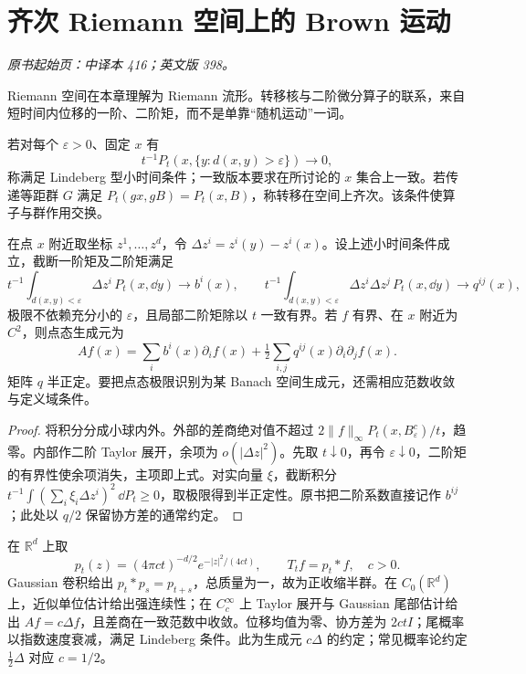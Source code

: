 \section{齐次 Riemann 空间上的 Brown 运动}\label{sec:yosida-13-05}
\noindent\textit{原书起始页：中译本 416；英文版 398。}

Riemann 空间在本章理解为 Riemann 流形。转移核与二阶微分算子的联系，来自短时间内位移的一阶、二阶矩，而不是单靠“随机运动”一词。

\begin{definition}[局部性条件与空间齐次]
若对每个 $\varepsilon>0$、固定 $x$ 有
\[
 t^{-1}P_t(x,\{y:d(x,y)>\varepsilon\})\longrightarrow0,
\]
称满足 Lindeberg 型小时间条件；一致版本要求在所讨论的 $x$ 集合上一致。若传递等距群 $G$ 满足 $P_t(gx,gB)=P_t(x,B)$，称转移在空间上齐次。该条件使算子与群作用交换。
\end{definition}

\begin{proposition}[从局部矩得到生成元]\label{prop:y13-local-moments}
在点 $x$ 附近取坐标 $z^1,\ldots,z^d$，令 $\Delta z^i=z^i(y)-z^i(x)$。设上述小时间条件成立，截断一阶矩及二阶矩满足
\[
 t^{-1}\int_{d(x,y)<\varepsilon}\Delta z^i\,P_t(x,\dd y)\to b^i(x),\qquad
 t^{-1}\int_{d(x,y)<\varepsilon}\Delta z^i\Delta z^j\,P_t(x,\dd y)\to q^{ij}(x),
\]
极限不依赖充分小的 $\varepsilon$，且局部二阶矩除以 $t$ 一致有界。若 $f$ 有界、在 $x$ 附近为 $C^2$，则点态生成元为
\[
 Af(x)=\sum_i b^i(x)\partial_i f(x)+\tfrac12\sum_{i,j}q^{ij}(x)\partial_i\partial_j f(x).
\]
矩阵 $q$ 半正定。要把点态极限识别为某 Banach 空间生成元，还需相应范数收敛与定义域条件。
\end{proposition}
\begin{proof}
将积分分成小球内外。外部的差商绝对值不超过 $2\|f\|_\infty P_t(x,B_\varepsilon^c)/t$，趋零。内部作二阶 Taylor 展开，余项为 $o(|\Delta z|^2)$。先取 $t\downarrow0$，再令 $\varepsilon\downarrow0$，二阶矩的有界性使余项消失，主项即上式。对实向量 $\xi$，截断积分 $t^{-1}\int(\sum_i\xi_i\Delta z^i)^2\,\dd P_t\ge0$，取极限得到半正定性。原书把二阶系数直接记作 $b^{ij}$；此处以 $q/2$ 保留协方差的通常约定。
\end{proof}

\begin{example}\label{exm:y13-gaussian-semigroup}
在 $\mathbb R^d$ 上取
\[
 p_t(z)=(4\pi ct)^{-d/2}e^{-|z|^2/(4ct)},\qquad T_tf=p_t*f,\quad c>0.
\]
Gaussian 卷积给出 $p_t*p_s=p_{t+s}$，总质量为一，故为正收缩半群。在 $C_0(\mathbb R^d)$ 上，近似单位估计给出强连续性；在 $C_c^\infty$ 上 Taylor 展开与 Gaussian 尾部估计给出 $Af=c\Delta f$，且差商在一致范数中收敛。位移均值为零、协方差为 $2ctI$；尾概率以指数速度衰减，满足 Lindeberg 条件。此为生成元 $c\Delta$ 的约定；常见概率论约定 $\tfrac12\Delta$ 对应 $c=1/2$。
\end{example}

